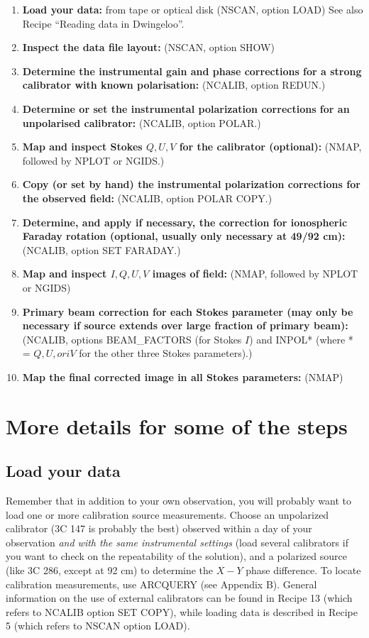 \begin{enumerate}
\item {\bf Load your data:} from tape or optical disk (NSCAN, option LOAD) See
also Recipe ``Reading data in Dwingeloo''.
\item {\bf Inspect the data file layout:} (NSCAN, option SHOW)
\item {\bf Determine the instrumental gain and phase corrections for a strong
calibrator with known polarisation:} (NCALIB, option REDUN.)
\item {\bf Determine or set the instrumental polarization corrections for an
unpolarised calibrator:} (NCALIB, option POLAR.)
\item {\bf Map and inspect Stokes $Q, U, V$ for the calibrator (optional):}
(NMAP, followed by NPLOT or NGIDS.)
\item {\bf Copy (or set by hand) the instrumental polarization corrections for
the observed field:} (NCALIB, option POLAR COPY.)
\item {\bf Determine, and apply if necessary, the correction for ionospheric
Faraday rotation (optional, usually only necessary at 49/92 cm):} (NCALIB,
option SET FARADAY.)
\item {\bf Map and inspect $I, Q, U, V$ images of field:} (NMAP, followed by
NPLOT or NGIDS)
\item {\bf Primary beam correction for each Stokes parameter (may only be
necessary if source extends over large fraction of primary beam):} (NCALIB,
options BEAM\_FACTORS (for Stokes $I$) and INPOL* (where * = $Q, U, or iV$ for
the other three Stokes parameters).)
\item {\bf Map the final corrected image in all Stokes parameters:} (NMAP)
\end{enumerate}


\section{More details for some of the steps}
\label{.detail}

\subsection{Load your data}

        Remember that in addition to your own observation, you will probably
want to load one or more calibration source measurements. Choose an unpolarized
calibrator (3C 147 is probably the best) observed within a day of your
observation {\it and with the same instrumental settings} (load several
calibrators if you want to check on the repeatability of the solution), and a
polarized source (like 3C 286, except at 92 cm) to determine the $X-Y$ phase
difference. To locate calibration measurements, use ARCQUERY (see Appendix B).
General information on the use of external calibrators can be found in Recipe
13 (which refers to NCALIB option SET COPY), while loading data is described in
Recipe 5 (which refers to NSCAN option LOAD).

